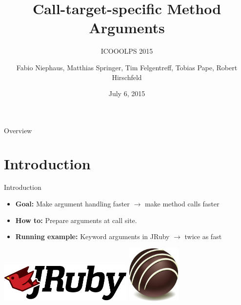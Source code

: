 \documentclass[xcolor=dvipsname]{beamer} %
\title{Call-target-specific Method Arguments}
\subtitle{ICOOOLPS 2015}
\author{Fabio Niephaus, Matthias Springer, Tim Felgentreff, Tobias Pape, Robert Hirschfeld}
\date{July 6, 2015}
\institute[2012]{Hasso Plattner Institute, Software Architecture Group}
\begin{document}
\begin{frame}[plain]
	\maketitle
\end{frame}
\begin{frame}{Overview}
	\tableofcontents[hideallsubsections]
\end{frame}

\section{Introduction}
\begin{frame}{Introduction}
	\begin{itemize}
		\item \textbf{Goal:} Make argument handling faster $\rightarrow$ make method calls faster
		\item \textbf{How to:} Prepare arguments at call site.
		\item \textbf{Running example:} Keyword arguments in JRuby $\rightarrow$ twice as fast
	\end{itemize}

	\begin{table}
		\centering
		\includegraphics[width=0.5\textwidth]{jruby.png} \qquad \qquad
		\includegraphics[width=0.2\textwidth]{truffle.jpg}
	\end{table}
\end{frame}
\end{document}

